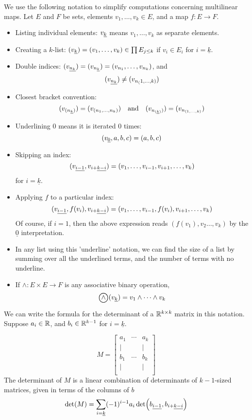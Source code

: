 \documentclass[../main-manifolds.tex]{subfiles}
\begin{document}
We use the following notation to simplify computations concerning multilinear maps. Let $E$ and $F$ be sets, elements $v_1,\ldots, v_k\in E$, and a map $f: E\to F$.
\begin{itemize}
    \item Listing individual elements: $\UL{v}[k]$ means $v_1,\ldots,v_k$ as separate elements. 
    \item Creating a $k$-list: $(\UL{v}[k]) = (v_1,\ldots, v_k)\in \prod E_{j\leq k}$ if $v_i\in E_i$ for $i = \underline{k}$.
    \item Double indices: $(\UL{v}[n_k]) = (v_{n_{\underline{k}}}) = (v_{n_1},\ldots, v_{n_k})$, and
    \[
        (\UL{v}[n_k]) \neq (v_{n_(1,\ldots,k)})
    \]
    \item Closest bracket convention:
    \[
        (v_{(n_{\underline{k}})}) = (v_{(n_1, \ldots, n_k)})\qqtext{and}(v_{n_{(\underline{k})})}) = (v_{n_{(1, \ldots, k)}})
    \]
    \item Underlining $0$ means it is iterated $0$ times: 
    \[
        (\UL{v}[0], a,b,c) = (a,b,c)
    \]
    \item Skipping an index: 
    \[
        (\UL{v}[i-1],\UL{v}[i+][k-i]) = (v_{1},\ldots, v_{i-1},v_{i+1},\ldots, v_{k})
    \]
    for $i = \underline{k}$.
    \item Applying $f$ to a particular index: 
    \[
        (\UL{v}[i-1], f(v_{i}), \UL{v}[i+][k-i]) = (v_1,\ldots, v_{i-1}, f(v_i), v_{i+1}, \ldots, v_k)
    \]
    Of course, if $i=1$, then the above expression reads $(f(v_1), v_2\ldots, v_k)$ by the $\underline{0}$ interpretation.
    \item In any list using this 'underline' notation, we can find the size of a list by summing over all the underlined terms, and the number of terms with no underline.
    \item If $\wedge: E\times E\to F$ is any associative binary operation,
    \[
        \bigowedge(\UL{v}[k]) = v_1\wedge\cdots \wedge v_k
    \]
\end{itemize}
\begin{remark}
We can write the formula for the determinant of a $\mathbb{R}^{k\times k}$ matrix in this notation. Suppose $a_i\in\mathbb{R}$, and $b_i\in\mathbb{R}^{k-1}$ for $i=\underline{k}$.

\[
M = \begin{bmatrix}
    a_1 & \cdots & a_k \\[1ex]
    \vert &  & \vert \\
    b_1 & \cdots & b_k \\
    \vert &  & \vert \\[1ex]
\end{bmatrix}
\]
The determinant of $M$ is a linear combination of determinants of $k-1$-sized matrices, given in terms of the columns of $b$
\[
    \det(M) = \sum_{i=\underline{k}}(-1)^{i-1} a_i\det(\UL{b}[i-1],\UL{b}[i+][k-i])
\]    
\end{remark}
\end{document}
